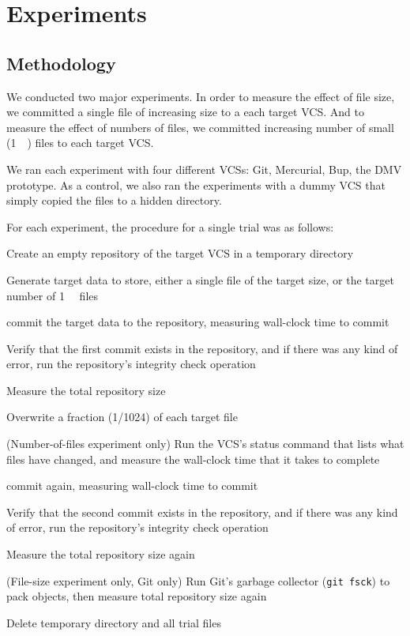 \section{Experiments}

\subsection{Methodology}

We conducted two major experiments.
In order to measure the effect of file size, we committed a single file of increasing size to a each target \gls{VCS}.
And to measure the effect of numbers of files, we committed increasing number of small (\SI{1}{\kibi\byte}) files to each target \gls{VCS}.

We ran each experiment with four different \glspl{VCS}: Git, Mercurial, Bup, the DMV prototype.
As a control, we also ran the experiments with a dummy \gls{VCS} that simply copied the files to a hidden directory.


For each experiment, the procedure for a single trial was as follows:
\begin{tight_enumerate}
    \item Create an empty \gls{repository} of the target \gls{VCS} in a temporary directory
    \item Generate target data to store, either a single file of the target size, or the target number of \SI{1}{\kibi\byte} files
    \item \Gls{commit} the target data to the \gls{repository}, measuring wall-clock time to \gls{commit}
    \item Verify that the first \gls{commit} exists in the \gls{repository}, and if there was any kind of error, run the \gls{repository}'s integrity check operation
    \item Measure the total \gls{repository} size
    \item Overwrite a fraction (\num{1/1024}) of each target file
    \item (Number-of-files experiment only) Run the \gls{VCS}'s status command that lists what files have changed, and measure the wall-clock time that it takes to complete
    \item \Gls{commit} again, measuring wall-clock time to \gls{commit}
    \item Verify that the second \gls{commit} exists in the \gls{repository}, and if there was any kind of error, run the \gls{repository}'s integrity check operation
    \item Measure the total \gls{repository} size again
    \item (File-size experiment only, Git only) Run Git's garbage collector (\lstinline{git fsck}) to pack objects, then measure total \gls{repository} size again
    \item Delete temporary directory and all trial files
\end{tight_enumerate}


